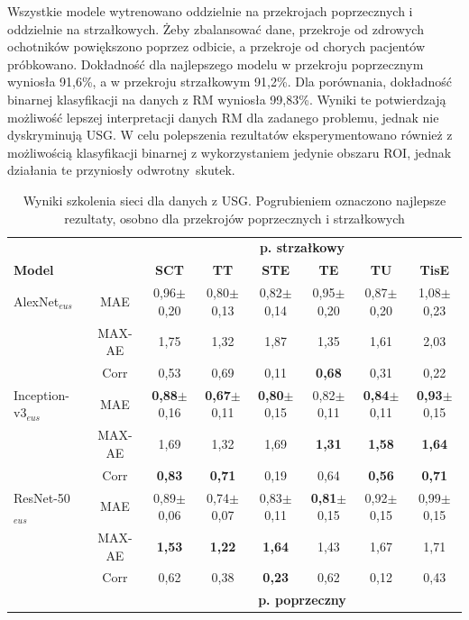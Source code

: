 Wszystkie modele wytrenowano oddzielnie na przekrojach poprzecznych i oddzielnie na strzałkowych. Żeby zbalansować dane, przekroje od zdrowych ochotników powiększono poprzez odbicie, a przekroje od chorych pacjentów próbkowano. Dokładność dla najlepszego modelu w przekroju poprzecznym wyniosła 91,6\%, a w przekroju strzałkowym 91,2\%. Dla porównania, dokładność binarnej klasyfikacji na danych z RM wyniosła 99,83\%. Wyniki te potwierdzają możliwość lepszej interpretacji danych RM dla zadanego problemu, jednak nie dyskryminują USG. W celu polepszenia rezultatów eksperymentowano również z możliwością klasyfikacji binarnej z wykorzystaniem jedynie obszaru ROI, jednak działania te przyniosły odwrotny~skutek.  
\vspace{6px}
\renewcommand{\arraystretch}{1.2}
\begin{table}[h]
	\scriptsize
	\setlength{\tabcolsep}{3pt}
	\centering
	\caption{Wyniki szkolenia sieci dla danych z USG. Pogrubieniem oznaczono najlepsze rezultaty, osobno dla przekrojów poprzecznych i strzałkowych}
	\label{tab:usg_train_cross-validation}
	\begin{tabular}{lc||c|c|c|c|c|c}
		& & \multicolumn{6}{c}{\textbf{p. strzałkowy}} \\
		\textbf{Model} & & \textbf{SCT} & \textbf{TT} & \textbf{STE} & \textbf{TE} & \textbf{TU} & \textbf{TisE} \\ \hline \hline
		AlexNet$_{eus}$ & MAE & 0,96$\pm$0,20 & 0,80$\pm$0,13 & 0,82$\pm$0,14 & 0,95$\pm$0,20 & 0,87$\pm$0,20 & 1,08$\pm$0,23  \\
		& MAX-AE & 1,75 & 1,32 & 1,87 & 1,35 & 1,61 & 2,03 \\ 
		& Corr & 0,53 & 0,69 & 0,11 & \textbf{0,68} & 0,31 & 0,22 \\ \hline
		Inception-v3$_{eus}$ & MAE & \textbf{0,88}$\pm$0,16 & \textbf{0,67}$\pm$0,11 & \textbf{0,80}$\pm$0,15 & 0,82$\pm$0,11 & \textbf{0,84}$\pm$0,11 & \textbf{0,93}$\pm$0,15  \\
		& MAX-AE & 1,69 & 1,32 & 1,69 & \textbf{1,31} & \textbf{1,58} & \textbf{1,64} \\ 
		& Corr & \textbf{0,83} & \textbf{0,71} & 0,19 & 0,64 & \textbf{0,56} & \textbf{0,71} \\ \hline
		ResNet-50$_{eus}$ & MAE & 0,89$\pm$0,06 & 0,74$\pm$0,07 & 0,83$\pm$0,11 & \textbf{0,81}$\pm$0,15 & 0,92$\pm$0,15 & 0,99$\pm$0,15 \\
		& MAX-AE & \textbf{1,53} & \textbf{1,22} & \textbf{1,64} & 1,43 & 1,67 & 1,71 \\
		& Corr & 0,62 & 0,38 & \textbf{0,23} & 0,62 & 0,12 & 0,43 \\ \hline \hline
		& & \multicolumn{6}{c}{\textbf{p. poprzeczny}} \\
		

\end{tabular}
\end{table}
